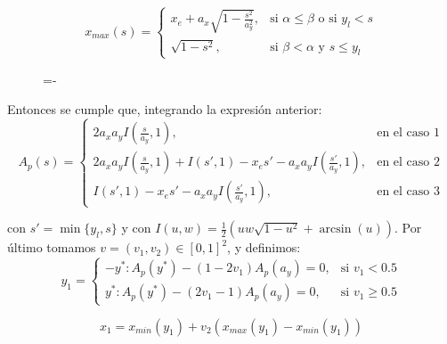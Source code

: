 \[ x_{max}(s) = 
   \begin{cases} 
       x_e+a_x\sqrt{1-\frac{s^2}{a_y^2}},  & \text{si $\alpha\leq\beta$ o si $y_l<s$} \\
       \sqrt{1-s^2}, & \text{si $\beta < \alpha$ y $s\leq y_l$}
   \end{cases}
\]

\begin{figure}[h]
  \lineskip=-\fboxrule
\end{figure}

Entonces se cumple que, integrando la expresión anterior:
\[ A_p(s) = 
   \begin{cases} 
       2a_xa_yI(\frac{s}{a_y},1),  & \text{en el caso 1} \\
       2a_xa_yI(\frac{s}{a_y},1) + I(s',1)-x_es' - a_xa_yI(\frac{s'}{a_y},1),  & \text{en el caso 2} \\
       I(s',1)- x_es' -a_xa_yI(\frac{s'}{a_y},1),  & \text{en el caso 3} 
   \end{cases}
\]

con $s'=\min\{y_l,s\}$ y con $I(u,w) = \frac{1}{2}(uw\sqrt{1-u^2} + \arcsin(u))$. Por último tomamos $v=(v_1,v_2)\in[0,1]^2$, y definimos:
\[ y_1 = 
   \begin{cases} 
      -y^*: A_p(y^*)-(1-2v_1)A_p(a_y)=0,  & \text{si $v_1<0.5$} \\
      y^*:  A_p(y^*)-(2v_1-1)A_p(a_y)=0,  & \text{si $v_1\geq 0.5$}
   \end{cases}
\]

$$x_1 = x_{min}(y_1) + v_2 (x_{max}(y_1) - x_{min}(y_1))$$

